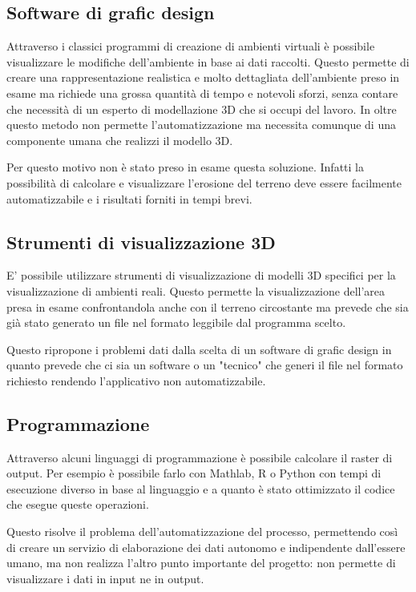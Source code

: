 \subsection{Software di grafic design}
Attraverso i classici programmi di creazione di ambienti virtuali è possibile visualizzare le modifiche dell'ambiente in base ai dati raccolti. Questo permette di creare una rappresentazione realistica e molto dettagliata dell'ambiente preso in esame ma richiede una grossa quantità di tempo e notevoli sforzi, senza contare che necessità di un esperto di modellazione 3D che si occupi del lavoro. In oltre questo metodo non permette l'automatizzazione ma necessita comunque di una componente umana che realizzi il modello 3D. 

Per questo motivo non è stato preso in esame questa soluzione. Infatti la possibilità di calcolare e visualizzare l'erosione del terreno deve essere facilmente automatizzabile e i risultati forniti in tempi brevi.

\subsection{Strumenti di visualizzazione 3D}
E' possibile utilizzare strumenti di visualizzazione di modelli 3D specifici per la visualizzazione di ambienti reali. Questo permette la visualizzazione dell'area presa in esame confrontandola anche con il terreno circostante ma prevede che sia già stato generato un file nel formato leggibile dal programma scelto.

Questo ripropone i problemi dati dalla scelta di un software di grafic design in quanto prevede che ci sia un software o un "tecnico" che generi il file nel formato richiesto rendendo l'applicativo non automatizzabile.

\subsection{Programmazione}
Attraverso alcuni linguaggi di programmazione è possibile calcolare il raster di output. Per esempio è possibile farlo con Mathlab, R o Python con tempi di esecuzione diverso in base al linguaggio e a quanto è stato ottimizzato il codice che esegue queste operazioni. 

Questo risolve il problema dell'automatizzazione del processo, permettendo così di creare un servizio di elaborazione dei dati autonomo e indipendente dall'essere umano, ma non realizza l'altro punto importante del progetto: non permette di visualizzare i dati in input ne in output.

